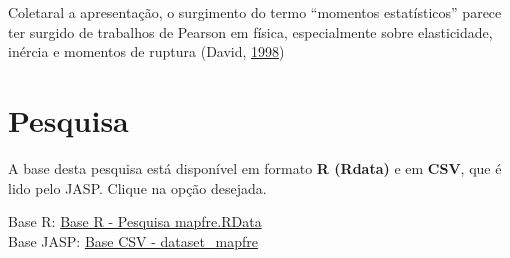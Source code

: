 \documentclass[
]{book}
\newenvironment{Shaded}{\begin{snugshade}}{\end{snugshade}}
\newcommand{\CommentTok}[1]{\textcolor[rgb]{0.56,0.35,0.01}{\textit{#1}}}
\newcommand{\DecValTok}[1]{\textcolor[rgb]{0.00,0.00,0.81}{#1}}
\newcommand{\KeywordTok}[1]{\textcolor[rgb]{0.13,0.29,0.53}{\textbf{#1}}}
\newcommand{\NormalTok}[1]{#1}
\newcommand{\OperatorTok}[1]{\textcolor[rgb]{0.81,0.36,0.00}{\textbf{#1}}}
\newcommand{\StringTok}[1]{\textcolor[rgb]{0.31,0.60,0.02}{#1}}
\begin{document}
\begin{Shaded}
\end{Shaded}

Coletaral a apresentação, o surgimento do termo ``momentos
estatísticos'' parece ter surgido de trabalhos de Pearson em física,
especialmente sobre elasticidade, inércia e momentos de ruptura (David,
\protect\hyperlink{ref-David1998}{1998})

\hypertarget{pesquisa}{%
\section{Pesquisa}\label{pesquisa}}

\begin{base}

A base desta pesquisa está disponível em formato \textbf{R (Rdata)} e em
\textbf{CSV}, que é lido pelo JASP. Clique na opção desejada.

Base R:
\href{https://github.com/anovabr/mqt/raw/master/bases/Base\%20R\%20-\%20Pesquisa\%20mapfre.RData}{Base
R - Pesquisa mapfre.RData}\\
Base JASP:
\href{https://github.com/anovabr/mqt/raw/master/bases/bases_csv_jasp.zip}{Base
CSV - dataset\_mapfre}

\end{base}
\end{document}

